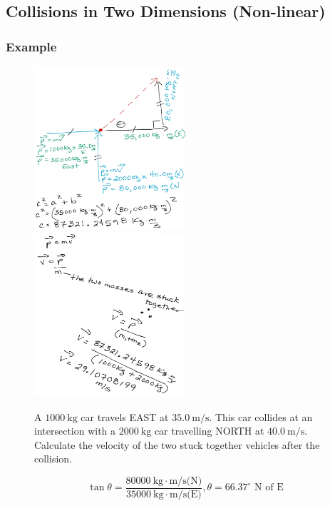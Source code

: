 \documentclass[a4paper,12pt]{article}
\begin{document}
\subsection{Collisions in Two Dimensions (Non-linear)}
\subsubsection{Example}
\begin{figure}[H]
    \centering
    \caption{A $\SI{1000}{\kg}$ car travels EAST at $\SI{35.0}{\m/\s}$. This car collides at an intersection with a $\SI{2000}{\kg}$ car travelling NORTH at $\SI{40.0}{\m/\s}$. Calculate the velocity of the two stuck together vehicles after the collision.}
    \includegraphics[width=0.50\textwidth]{q-2dcol}
    \includegraphics[width=0.50\textwidth]{q-2dcol-b}
\end{figure}
$$\tan{\theta} = \frac{ \SI{80000}{\kg\cdot\m/\s}\textrm{(N)} }{ \SI{35000}{\kg\cdot\m/\s}\textrm{(E)} }, \theta = 66.37^\circ \textrm{ N of E}$$
\end{document}
